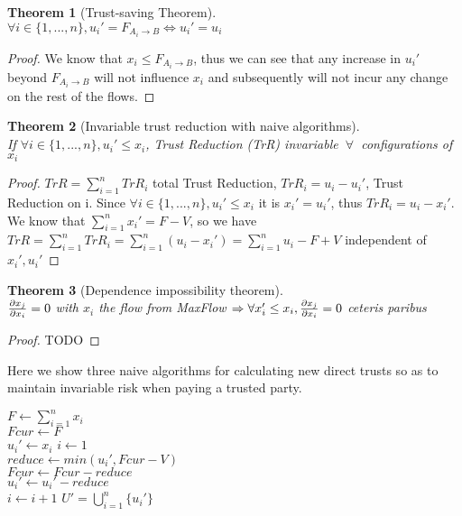 \documentclass[11pt]{article}
\newtheorem{theorem}{Theorem}[section]
\theoremstyle{definition}
\theoremstyle{corollary}
\begin{document}
    \begin{theorem}[Trust-saving Theorem] \ \\
    \label{trustsave}
       $\forall i \in \{1,...,n\}, u_i' = F_{A_i \rightarrow B} \Leftrightarrow u_i' = u_i$
    \end{theorem}
    \begin{proof}
       We know that $x_i \leq F_{A_i \rightarrow B}$, thus we can see that any increase in $u_i'$ beyond
       $F_{A_i \rightarrow B}$ will not influence $x_i$ and subsequently will not incur any change on the rest of the flows.
    \end{proof}

    \begin{theorem}[Invariable trust reduction with naive algorithms] \ \\
    \label{invariability}
       If $\forall i \in \{1,...,n\},u_i' \leq x_i$, Trust Reduction (TrR) invariable $\: \forall \:$ configurations of $x_i$
    \end{theorem}
    \begin{proof}
       $TrR = \sum_{i=1}^{n}TrR_i$ total Trust Reduction, $TrR_i = u_i - u_i'$, Trust Reduction on i.
       Since $\forall i \in \{1,...,n\},u_i' \leq x_i$ it is $x_i' = u_i'$, thus $TrR_i = u_i - x_i'$. We know that
       $\sum_{i=1}^{n}x_i' = F - V$, so we have $TrR = \sum_{i=1}^{n}TrR_i = \sum_{i=1}^{n}(u_i - x_i') = 
       \sum_{i=1}^{n}u_i - F + V$ independent of $x_i', u_i'$
    \end{proof}

    \begin{theorem}[Dependence impossibility theorem] \ \\
    \label{independence}
       ${\partial x_j \over \partial x_i} = 0$ with $x_i$ the flow from MaxFlow $\Rightarrow
         \forall x_i' \leq x_i, {\partial x_j \over \partial x_i} = 0$ ceteris paribus
    \end{theorem}
    \begin{proof}
       TODO
    \end{proof}

    Here we show three naive algorithms for calculating new direct trusts so as to maintain invariable risk when paying
    a trusted party. \\
    \begin{algorithm}[H]
       $F \gets \sum_{i=1}^{n}x_i$ \\
       $Fcur \gets F$ \\
          {$u_i' \gets x_i$} 
       $i \gets 1$ \\
          {$reduce \gets min(u_i', Fcur - V)$ \\
           $Fcur \gets Fcur - reduce$ \\
           $u_i' \gets u_i' - reduce$ \\
           $i \gets i + 1$}
       \Return $U' = \bigcup_{i=1}^{n}\{u_i'\}$
       \caption{First-come, first-served trust transfer}
    \end{algorithm}
\end{document}
